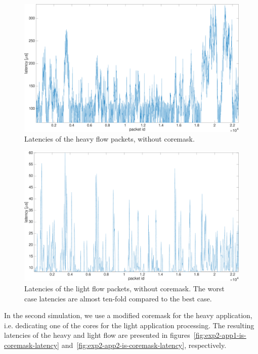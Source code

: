 \begin{figure}[]
  \begin{center}
    \includegraphics[width=\textwidth]{images/experiment/exp2-app1-no-coremask-latency.pdf}
    \caption{Latencies of the heavy flow packets, without coremask.}
    \label{fig:exp2-app1-no-coremask-latency}
  \end{center}
\end{figure}

\begin{figure}[]
  \begin{center}
    \includegraphics[width=\textwidth]{images/experiment/exp2-app2-no-coremask-latency.pdf}
    \caption{Latencies of the light flow packets, without coremask. The worst case latencies are almost ten-fold compared to the best case.}
    \label{fig:exp2-app2-no-coremask-latency}
  \end{center}
\end{figure}

In the second simulation, we use a modified coremask for the heavy application, i.e. dedicating one of the cores for the light application processing. The resulting latencies of the heavy and light flow are presented in figures~\ref{fig:exp2-app1-is-coremask-latency} and~\ref{fig:exp2-app2-is-coremask-latency}, respectively.

